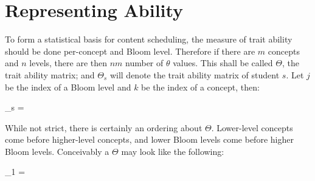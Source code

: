 \section{Representing Ability}

To form a statistical basis for content scheduling, the measure of trait
ability should be done per-concept and Bloom level.  Therefore if there are $m$
concepts and $n$ levels, there are then $nm$ number of $\theta$ values.  This
shall be called $\Theta$, the trait ability matrix; and $\Theta_s$ will denote
the trait ability matrix of student $s$.  Let $j$ be the index of a Bloom level
and $k$ be the index of a concept, then:

\begin{equations}
\Theta_s =
\end{equations}

While not strict, there is certainly an ordering about $\Theta$. Lower-level
concepts come before higher-level concepts, and lower Bloom levels come before
higher Bloom levels.  Conceivably a $\Theta$ may look like the following:

\begin{equations}
\Theta_1 =
\end{equations}
\vspace{12pt}

